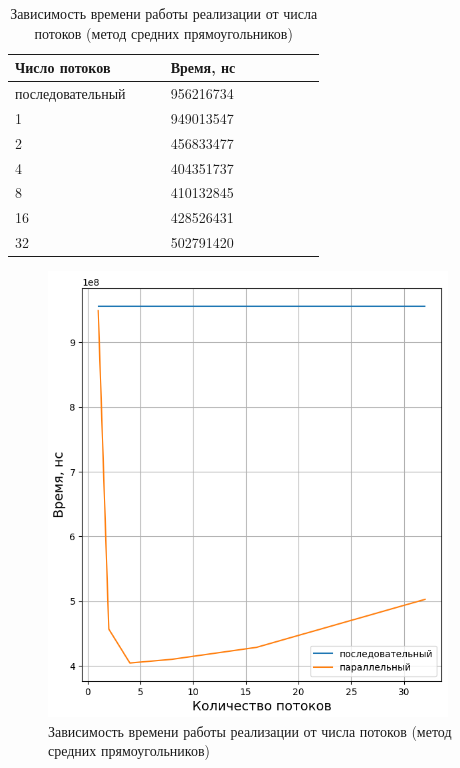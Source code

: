 \begin{table}[h]
    \begin{center}
    \begin{threeparttable}
        \captionsetup{justification=raggedright}
        \caption{\label{tab:threads-midpoint}Зависимость времени работы реализации от числа потоков (метод средних прямоугольников)}
        \begin{tabular}{|p{0.4\linewidth}|p{0.4\linewidth}|}
            \hline
            \bfseries Число потоков & \bfseries Время, нс \\
            \hline
            последовательный & 956216734 \\
            \hline
            1 & 949013547 \\
            \hline
            2 & 456833477 \\
            \hline
            4 & 404351737 \\
            \hline
            8 & 410132845 \\
            \hline
            16 & 428526431 \\
            \hline
            32 & 502791420 \\
            \hline
        \end{tabular}
    \end{threeparttable}
    \end{center}
\end{table} 

\begin{figure}[h!btp]
	\centering
	\includegraphics[width=300pt]{inc/gr1.png}
	\caption{Зависимость времени работы реализации от числа потоков (метод средних прямоугольников)}
	\label{fig:gr1}	
\end{figure}

